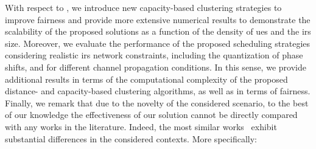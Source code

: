 With respect to \cite{rech2023downlink}, we introduce new capacity-based clustering strategies to improve fairness and provide more extensive numerical results to demonstrate the scalability of the proposed solutions as a function of the density of \glspl{ue} and the \gls{irs} size. Moreover, we evaluate the performance of the proposed scheduling strategies considering realistic \gls{irs} network constraints, including the quantization of phase shifts, and for different channel propagation conditions.
In this sense, we provide additional results in terms of the computational complexity of the proposed distance- and capacity-based clustering algorithms, as well as in terms of fairness.
Finally, we remark that due to the novelty of the considered scenario, 
to the best of our knowledge the effectiveness of our solution cannot be directly compared with any works in the literature. Indeed, the most similar works~\cite{Lee23Harmony,guo2021intelligent, mu2021capacity,jamali2022low} exhibit substantial differences in the considered contexts.
More specifically:
